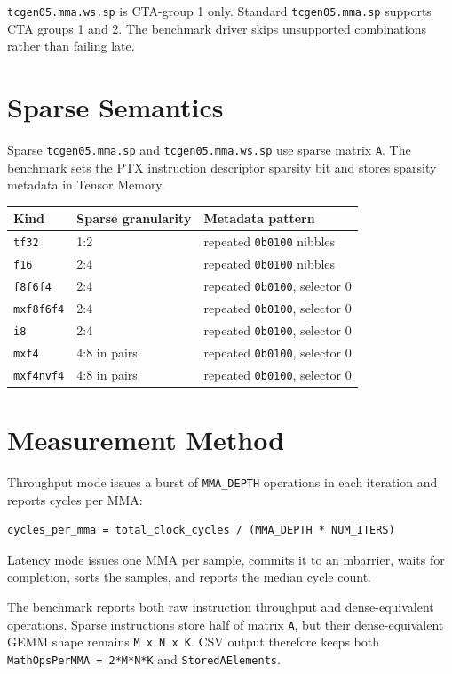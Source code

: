 \documentclass[11pt]{article}
\begin{document}
\texttt{tcgen05.mma.ws.sp} is CTA-group 1 only. Standard
\texttt{tcgen05.mma.sp} supports CTA groups 1 and 2. The benchmark driver
skips unsupported combinations rather than failing late.

\section{Sparse Semantics}

Sparse \texttt{tcgen05.mma.sp} and \texttt{tcgen05.mma.ws.sp} use sparse matrix
\texttt{A}. The benchmark sets the PTX instruction descriptor sparsity bit and
stores sparsity metadata in Tensor Memory.

\begin{tabular}{lll}
\toprule
Kind & Sparse granularity & Metadata pattern \\
\midrule
\texttt{tf32} & 1:2 & repeated \texttt{0b0100} nibbles \\
\texttt{f16} & 2:4 & repeated \texttt{0b0100} nibbles \\
\texttt{f8f6f4} & 2:4 & repeated \texttt{0b0100}, selector 0 \\
\texttt{mxf8f6f4} & 2:4 & repeated \texttt{0b0100}, selector 0 \\
\texttt{i8} & 2:4 & repeated \texttt{0b0100}, selector 0 \\
\texttt{mxf4} & 4:8 in pairs & repeated \texttt{0b0100}, selector 0 \\
\texttt{mxf4nvf4} & 4:8 in pairs & repeated \texttt{0b0100}, selector 0 \\
\bottomrule
\end{tabular}

\section{Measurement Method}

Throughput mode issues a burst of \texttt{MMA\_DEPTH} operations in each
iteration and reports cycles per MMA:

\begin{lstlisting}
cycles_per_mma = total_clock_cycles / (MMA_DEPTH * NUM_ITERS)
\end{lstlisting}

Latency mode issues one MMA per sample, commits it to an mbarrier, waits for
completion, sorts the samples, and reports the median cycle count.

The benchmark reports both raw instruction throughput and dense-equivalent
operations. Sparse instructions store half of matrix \texttt{A}, but their
dense-equivalent GEMM shape remains \texttt{M x N x K}. CSV output therefore
keeps both \texttt{MathOpsPerMMA = 2*M*N*K} and \texttt{StoredAElements}.
\end{document}
